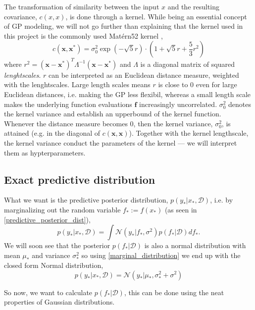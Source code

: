 \begin{testexample}
    The transformation of similarity between the input $x$ and the resulting covariance, $c(x,x)$, is
    done through a kernel. While being an essential concept of GP modeling, we will not go further
    than explaining that the kernel used in this project is the commonly used Matérn52 kernel
    \cite[157]{TakeHumanOutOfLoop},
    $$c(\textbf{x},\textbf{x}^*) = \sigma_0^2 \exp(-\sqrt{5}r)\cdot \left(
    1+\sqrt{5}r+\frac{5}{3}r^2 \right)$$ where $r^2 = (\textbf{x}-\textbf{x}^*)^T \Lambda^{-1}
    (\textbf{x}-\textbf{x}^*)$ and $\Lambda$ is a diagonal matrix of squared \textit{lenghtscales}.
    $r$ can be interpreted as an Euclidean distance measure, weighted with the lenghtscales. Large
    length scales means $r$ is close to 0 even for large Euclidean distances, i.e. making the GP
    less flexibil, whereas a small length scale makes the underlying function evaluations
    $\textbf{f}$ increasingly uncorrelated. $\sigma_0^2$ denotes the kernel variance and establish
    an upperbound of the kernel function. Whenever the distance measure becomes 0, then the
   kernel variance, $\sigma_0^2$, is attained (e.g. in the diagonal of $c(\textbf{x}, \textbf{x})$). Together with the kernel
    lengthscale, the kernel variance conduct the parameters of the kernel --- we will interpret them
    as hypterparameters. 
\end{testexample}

\subsection{Exact predictive distribution}
What we want is the predictive posterior distribution, $p(y_*|x_*, \mathcal{D})$, i.e. by
marginalizing out the random variable $f_* := f(x_*)$ (as seen in
\eqref{predictive_posterior_dist}),
\begin{equation}\label{GP_predictive}
    p(y_*|x_*,\mathcal{D}) = \int \mathcal{N}(y_*|f_*, \sigma^2) p(f_*|\mathcal{D})df_*.
\end{equation}
We will soon see that the posterior $p(f_*|\mathcal{D})$ is also a normal distribution 
with mean $\mu_*$ and variance $\sigma^2_*$ so
using \eqref{marginal_distribution} we end up with the closed form Normal distribution, 
$$p(y_*|x_*,\mathcal{D}) = \mathcal{N}(y_*|\mu_*,\sigma^2_*+\sigma^2)$$

So now, we want to calculate $p(f_*|\mathcal{D})$, this can be done using the neat properties of Gaussian
distributions. 


